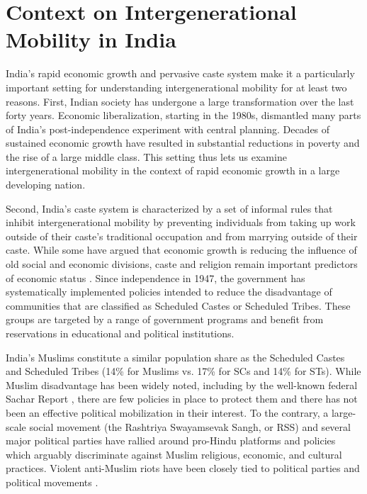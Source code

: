 \documentclass[12pt,letterpaper]{article}
\numberwithin{equation}{section}
\begin{document}
\section{Context on Intergenerational Mobility in India}
\label{sec:context}

India's rapid economic growth and pervasive caste system make it a particularly
important setting for understanding intergenerational mobility for at least two reasons. First, Indian society has undergone a large transformation over the last forty
years. Economic liberalization, starting in the 1980s, dismantled many parts of
India's post-independence experiment with central planning. Decades of sustained
economic growth have resulted in substantial reductions in poverty and the rise of a
large middle class. This setting thus lets us examine
intergenerational mobility in the context of rapid economic growth in a
large developing nation. 

Second, India's caste system is characterized by a set of informal rules that inhibit intergenerational mobility by preventing individuals from taking up work outside of their caste's traditional occupation and from marrying outside of their caste. While some have argued that economic growth is reducing the influence of old social and economic divisions, caste and religion remain important predictors of economic status \cite{munshi2006,ito2009,hnatkovska2013,shariq2019}. Since independence in 1947, the government has systematically implemented policies intended to reduce the disadvantage of communities that are classified as Scheduled Castes or Scheduled Tribes. These groups are targeted by a range of government programs and benefit from reservations in educational and political institutions.

India's Muslims constitute a similar population share as the Scheduled Castes
and Scheduled Tribes (14\% for Muslims vs. 17\% for SCs and 14\% for STs). While
Muslim disadvantage has been widely noted, including by the well-known federal
Sachar Report \citeyear{sachar2006}, there are few policies in place to protect
them and there has not been an effective political mobilization in their
interest. To the contrary, a large-scale social movement (the Rashtriya
Swayamsevak Sangh, or RSS) and several major political parties have rallied
around pro-Hindu platforms and policies which arguably discriminate against
Muslim religious, economic, and cultural practices. Violent anti-Muslim riots
have been closely tied to political parties and political movements
\cite{wilkinson2006v,berenschot2012,blakeslee2018}.
\end{document}
